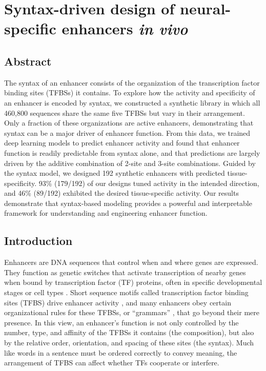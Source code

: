 \chapter{Syntax-driven design of neural-specific enhancers \textit{in vivo}}
\label{chap:chapter 2}

\section{Abstract}

The syntax of an enhancer consists of the organization of the transcription factor binding sites (TFBSs) it contains. To explore how the activity and specificity of an enhancer is encoded by syntax, we constructed a synthetic library in which all 460,800 sequences share the same five TFBSs but vary in their arrangement. Only a fraction of these organizations are active enhancers, demonstrating that syntax can be a major driver of enhancer function. From this data, we trained deep learning models to predict enhancer activity and found that enhancer function is readily predictable from syntax alone, and that predictions are largely driven by the additive combination of 2-site and 3-site combinations. Guided by the syntax model, we designed 192 synthetic enhancers with predicted tissue-specificity. 93\% (179/192) of our designs tuned activity in the intended direction, and 46\% (89/192) exhibited the desired tissue-specific activity. Our results demonstrate that syntax-based modeling provides a powerful and interpretable framework for understanding and engineering enhancer function.

\section{Introduction}

Enhancers are DNA sequences that control when and where genes are expressed. They function as genetic switches that activate transcription of nearby genes when bound by transcription factor (TF) proteins, often in specific developmental stages or cell types \cite{Levine2010-ry}. Short sequence motifs called transcription factor binding sites (TFBS) drive enhancer activity \cite{Stormo2010-xm}, and many enhancers obey certain organizational rules for these TFBSs, or “grammars” \cite{Jindal2021-zk}, that go beyond their mere presence. In this view, an enhancer’s function is not only controlled by the number, type, and affinity of the TFBSs it contains (the composition), but also by the relative order, orientation, and spacing of these sites (the syntax). Much like words in a sentence must be ordered correctly to convey meaning, the arrangement of TFBS can affect whether TFs cooperate or interfere.

